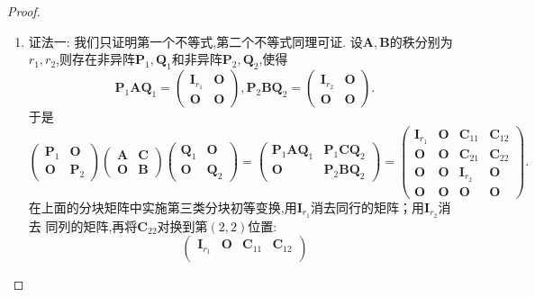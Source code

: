 \documentclass[../../main.tex]{subfiles}%
\begin{document}
\begin{proof}
\begin{enumerate}[(1)]
\item  {\color{blue}证法一:} 我们只证明第一个不等式,第二个不等式同理可证. 设\(\boldsymbol{A},\boldsymbol{B}\)的秩分别为\(r_1,r_2\),则存在非异阵\(\boldsymbol{P}_1,\boldsymbol{Q}_1\)和非异阵\(\boldsymbol{P}_2,\boldsymbol{Q}_2\),使得
\[
\boldsymbol{P}_1\boldsymbol{A}\boldsymbol{Q}_1=\begin{pmatrix}
\boldsymbol{I}_{r_1}&\boldsymbol{O}\\
\boldsymbol{O}&\boldsymbol{O}
\end{pmatrix}, \boldsymbol{P}_2\boldsymbol{B}\boldsymbol{Q}_2=\begin{pmatrix}
\boldsymbol{I}_{r_2}&\boldsymbol{O}\\
\boldsymbol{O}&\boldsymbol{O}
\end{pmatrix}.
\]
于是
\[
\begin{pmatrix}
\boldsymbol{P}_1&\boldsymbol{O}\\
\boldsymbol{O}&\boldsymbol{P}_2
\end{pmatrix}
\begin{pmatrix}
\boldsymbol{A}&\boldsymbol{C}\\
\boldsymbol{O}&\boldsymbol{B}
\end{pmatrix}
\begin{pmatrix}
\boldsymbol{Q}_1&\boldsymbol{O}\\
\boldsymbol{O}&\boldsymbol{Q}_2
\end{pmatrix}=
\begin{pmatrix}
\boldsymbol{P}_1\boldsymbol{A}\boldsymbol{Q}_1&\boldsymbol{P}_1\boldsymbol{C}\boldsymbol{Q}_2\\
\boldsymbol{O}&\boldsymbol{P}_2\boldsymbol{B}\boldsymbol{Q}_2
\end{pmatrix}=
\begin{pmatrix}
\boldsymbol{I}_{r_1}&\boldsymbol{O}&\boldsymbol{C}_{11}&\boldsymbol{C}_{12}\\
\boldsymbol{O}&\boldsymbol{O}&\boldsymbol{C}_{21}&\boldsymbol{C}_{22}\\
\boldsymbol{O}&\boldsymbol{O}&\boldsymbol{I}_{r_2}&\boldsymbol{O}\\
\boldsymbol{O}&\boldsymbol{O}&\boldsymbol{O}&\boldsymbol{O}
\end{pmatrix}.
\]
在上面的分块矩阵中实施第三类分块初等变换,用\(\boldsymbol{I}_{r_1}\)消去同行的矩阵；用\(\boldsymbol{I}_{r_2}\)消去
同列的矩阵,再将\(\boldsymbol{C}_{22}\)对换到第\((2,2)\)位置:
\[
\begin{pmatrix}
\boldsymbol{I}_{r_1}&\boldsymbol{O}&\boldsymbol{C}_{11}&\boldsymbol{C}_{12}\\

\end{pmatrix}\]
\end{enumerate}
\end{proof}
\end{document}
